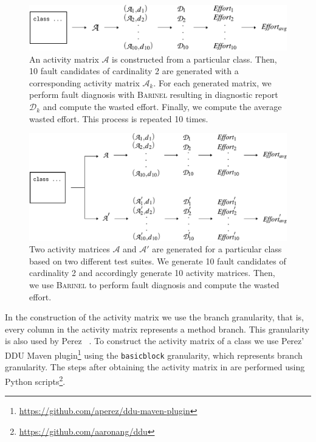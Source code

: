 \documentclass[twoside,a4paper,11pt]{memoir}
\begin{document}
\begin{figure}
  \includegraphics[width=\linewidth]{figures/effort_approach}
  \caption{An activity matrix \(\mathcal{A} \) is constructed from a particular class. Then, 10 fault candidates of cardinality 2 are generated with a corresponding activity matrix \(\mathcal{A}_k \). For each generated matrix, we perform fault diagnosis with \textsc{Barinel} resulting in diagnostic report \(\mathcal{D}_k \) and compute the wasted effort. Finally, we compute the average wasted effort. This process is repeated 10 times.}%
  \label{fig:fault_generation}
\end{figure}

\begin{figure}
  \includegraphics[width=\linewidth]{figures/delta_effort_approach}
  \caption{Two activity matrices \(\mathcal{A} \) and \(\mathcal{A}' \) are generated for a particular class based on two different test suites. We generate 10 fault candidates of cardinality 2 and accordingly generate 10 activity matrices. Then, we use \textsc{Barinel} to perform fault diagnosis and compute the wasted effort.}%
  \label{fig:fault_generation_delta}
\end{figure}

In the construction of the activity matrix we use the branch granularity, that is, every column in the activity matrix represents a method branch.
This granularity is also used by Perez \etal~\cite{DBLP:conf/icse/PerezAD17}.
To construct the activity matrix of a class we use Perez' DDU Maven plugin\footnote{\url{https://github.com/aperez/ddu-maven-plugin}} using the \texttt{basicblock} granularity, which represents branch granularity.
The steps after obtaining the activity matrix in  are performed using Python scripts\footnote{\url{https://github.com/aaronang/ddu}}.
\end{document}
